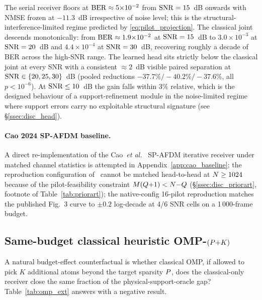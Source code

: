 The serial receiver floors at $\mathrm{BER}\approx 5{\times}10^{-2}$ from
$\mathrm{SNR}=15$~dB onwards with NMSE frozen at $-11.3$~dB
irrespective of noise level; this is the structural-interference-limited
regime predicted by \eqref{eq:pilot_projection}. The classical joint
descends monotonically: from $\mathrm{BER}\approx 1.9{\times}10^{-2}$ at $\mathrm{SNR}=15$~dB
to $3.0{\times}10^{-3}$ at $\mathrm{SNR}=20$~dB and $4.4{\times}10^{-4}$ at $\mathrm{SNR}=30$~dB,
recovering roughly a decade of BER across the high-SNR range. The learned head
sits strictly below the classical joint at every SNR with a consistent
$\approx 2$~dB visible paired separation at $\mathrm{SNR}\in\{20,25,30\}$~dB (pooled reductions
$-37.7\%/-40.2\%/-37.6\%$, all $p<10^{-6}$). At
$\mathrm{SNR}\leq 10$~dB the gain falls within $3\%$ relative, which is the
designed behaviour of a support-refinement module in the noise-limited
regime where support errors carry no exploitable structural signature
(see \S\ref{ssec:disc_head}).

\paragraph{Cao 2024 SP-AFDM baseline.}
A direct re-implementation of the Cao~\emph{et al.}~\cite{cao2024spomp}
SP-AFDM iterative receiver under matched channel statistics is
attempted in Appendix~\ref{app:cao_baseline}; the reproduction
configuration of~\cite{qing2024spafdm} cannot be matched head-to-head
at $N\geq 1024$ because of the pilot-feasibility constraint
$M(Q{+}1)<N{-}Q$ (\S\ref{ssec:disc_priorart}, footnote of
Table~\ref{tab:priorart}); the native-config 16-pilot reproduction
matches the published Fig.~3 curve to $\pm 0.2$ log-decade at 4/6
SNR cells on a 1\,000-frame budget.

\subsection{Same-budget classical heuristic OMP-$(P{+}K)$}
\label{ssec:exp_omppk}
A natural budget-effect counterfactual is whether classical OMP, if
allowed to pick $K$
additional atoms beyond the target sparsity $P$, does the
classical-only receiver close the same fraction of the
physical-support-oracle gap? Table~\ref{tab:omp_ext} answers with a
negative result.

